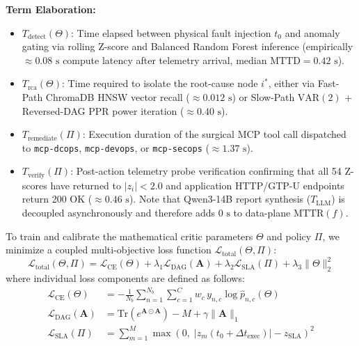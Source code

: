 \noindent\textbf{Term Elaboration:}
\begin{itemize}
    \item $T_{\text{detect}}(\Theta)$: Time elapsed between physical fault injection $t_0$ and anomaly gating via rolling Z-score and Balanced Random Forest inference (empirically $\approx 0.08\text{ s}$ compute latency after telemetry arrival, median $\text{MTTD} = 0.42\text{ s}$).
    \item $T_{\text{rca}}(\Theta)$: Time required to isolate the root-cause node $i^*$, either via Fast-Path ChromaDB HNSW vector recall ($\approx 0.012\text{ s}$) or Slow-Path $\text{VAR}(2)$ + Reversed-DAG PPR power iteration ($\approx 0.40\text{ s}$).
    \item $T_{\text{remediate}}(\Pi)$: Execution duration of the surgical MCP tool call dispatched to \texttt{mcp-dcops}, \texttt{mcp-devops}, or \texttt{mcp-secops} ($\approx 1.37\text{ s}$).
    \item $T_{\text{verify}}(\Pi)$: Post-action telemetry probe verification confirming that all 54 Z-scores have returned to $|z_i| < 2.0$ and application HTTP/GTP-U endpoints return 200 OK ($\approx 0.46\text{ s}$). Note that Qwen3-14B report synthesis ($T_{\text{LLM}}$) is decoupled asynchronously and therefore adds $0\text{ s}$ to data-plane $\text{MTTR}(f)$.
\end{itemize}

To train and calibrate the mathematical critic parameters $\Theta$ and policy $\Pi$, we minimize a coupled multi-objective loss function $\mathcal{L}_{\text{total}}(\Theta, \Pi)$:
\begin{equation}
\mathcal{L}_{\text{total}}(\Theta, \Pi) = \mathcal{L}_{\text{CE}}(\Theta) + \lambda_1 \mathcal{L}_{\text{DAG}}(\mathbf{A}) + \lambda_2 \mathcal{L}_{\text{SLA}}(\Pi) + \lambda_3 \|\Theta\|_2^2
\label{eq:total_loss}
\end{equation}
where individual loss components are defined as follows:
\begin{align}
\mathcal{L}_{\text{CE}}(\Theta) &= -\frac{1}{N_b} \sum_{n=1}^{N_b} \sum_{c=1}^{C} w_c \, y_{n,c} \log \hat{p}_{n,c}(\Theta) \label{eq:loss_ce} \\
\mathcal{L}_{\text{DAG}}(\mathbf{A}) &= \text{Tr}\left( e^{\mathbf{A} \odot \mathbf{A}} \right) - M + \gamma \|\mathbf{A}\|_1 \label{eq:loss_dag} \\
\mathcal{L}_{\text{SLA}}(\Pi) &= \sum_{m=1}^{M} \max\left( 0, \; |z_m(t_0 + \Delta t_{\text{exec}})| - z_{\text{SLA}} \right)^2 \label{eq:loss_sla}
\end{align}

